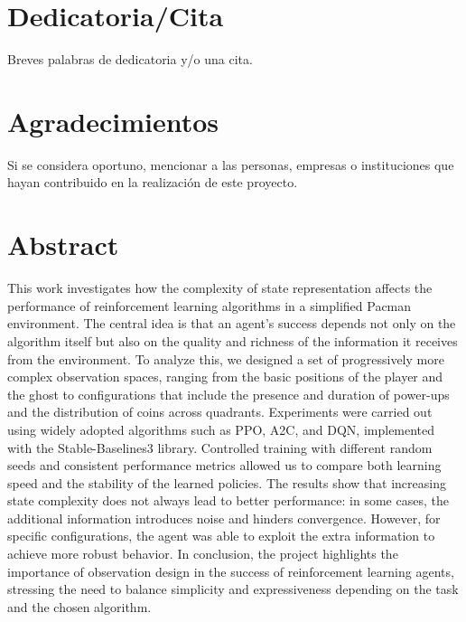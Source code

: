 \chapter*{Dedicatoria/Cita}

Breves palabras de dedicatoria y/o una cita.

\chapter*{Agradecimientos}

Si se considera oportuno, mencionar a las personas, empresas o instituciones que hayan contribuido en la realización de este proyecto.

\chapter*{Abstract}

\onehalfspacing

This work investigates how the complexity of state representation affects the performance of reinforcement learning algorithms in a simplified Pacman environment. The central idea is that an agent’s success depends not only on the algorithm itself but also on the quality and richness of the information it receives from the environment. To analyze this, we designed a set of progressively more complex observation spaces, ranging from the basic positions of the player and the ghost to configurations that include the presence and duration of power-ups and the distribution of coins across quadrants.
Experiments were carried out using widely adopted algorithms such as PPO, A2C, and DQN, implemented with the Stable-Baselines3 library. Controlled training with different random seeds and consistent performance metrics allowed us to compare both learning speed and the stability of the learned policies.
The results show that increasing state complexity does not always lead to better performance: in some cases, the additional information introduces noise and hinders convergence. However, for specific configurations, the agent was able to exploit the extra information to achieve more robust behavior.
In conclusion, the project highlights the importance of observation design in the success of reinforcement learning agents, stressing the need to balance simplicity and expressiveness depending on the task and the chosen algorithm.

